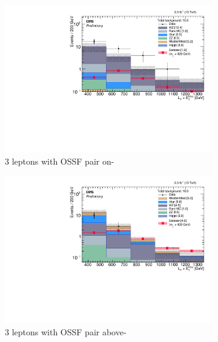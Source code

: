 \begin{figure}
\begin{center}
	\begin{subfigure}[b]{.5\textwidth}
		\includegraphics[width=\textwidth]{Results/plots/L3DYz1}
		\caption{3 leptons with OSSF pair on-\Z} \label{fig:Results/a}
	\end{subfigure}%
	\begin{subfigure}[b]{.5\textwidth}
		\includegraphics[width=\textwidth]{Results/plots/L3DYh1}
		\caption{3 leptons with OSSF pair above-\Z}
	\end{subfigure}
	\begin{subfigure}[b]{.5\textwidth}

\end{subfigure}
\end{center}
\end{figure}
